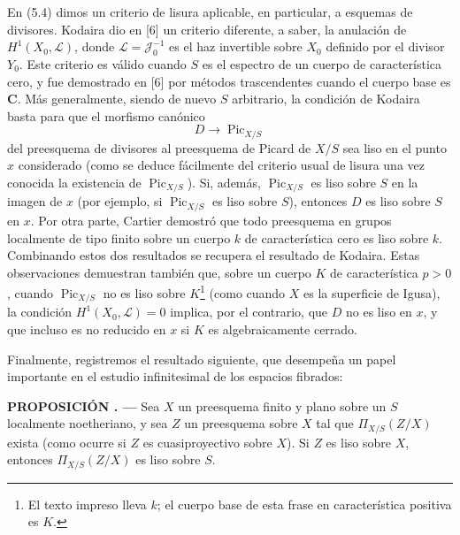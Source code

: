 \documentclass[11pt,twoside,openany]{book}
\numberwithin{equation}{section}
\theoremstyle{plain}
\theoremstyle{definition}
\theoremstyle{remark}
\newcommand{\result}[2]{%
  \par\medskip\noindent\textbf{#1%
  \if\relax\detokenize{#2}\relax\else\space#2\fi. ---}\enspace
}
\theoremstyle{plain}
\theoremstyle{definition}
\theoremstyle{remark}
\begin{document}
En (5.4) dimos un criterio de lisura aplicable, en particular, a esquemas de
divisores. Kodaira dio en [6] un criterio diferente, a saber, la anulación de
$H^1(X_0,\mathcal L)$, donde $\mathcal L=\mathcal J_0^{-1}$ es el haz
invertible sobre $X_0$ definido por el divisor $Y_0$. Este criterio es válido
cuando $S$ es el espectro de un cuerpo de característica cero, y fue demostrado
en [6] por métodos trascendentes cuando el cuerpo base es $\mathbf C$. Más
generalmente, siendo de nuevo $S$ arbitrario, la condición de Kodaira basta
para que el morfismo canónico
\[
D\longrightarrow\operatorname{Pic}_{X/S}
\]
del preesquema de divisores al preesquema de Picard de $X/S$ sea liso en el
punto $x$ considerado (como se deduce fácilmente del criterio usual de lisura
una vez conocida la existencia de $\operatorname{Pic}_{X/S}$). Si, además,
$\operatorname{Pic}_{X/S}$ es liso sobre $S$ en la imagen de $x$ (por ejemplo,
si $\operatorname{Pic}_{X/S}$ es liso sobre $S$), entonces $D$ es liso sobre
$S$ en $x$. Por otra parte, Cartier demostró que todo preesquema en grupos
localmente de tipo finito sobre un cuerpo $k$ de característica cero es liso
sobre $k$. Combinando estos dos resultados se recupera el resultado de
Kodaira. Estas observaciones demuestran también que, sobre un cuerpo $K$ de
característica $p>0$, cuando $\operatorname{Pic}_{X/S}$ no es liso sobre $K$\footnote{El texto impreso lleva $k$; el cuerpo base de esta frase en característica positiva es $K$.}
(como cuando $X$ es la superficie de Igusa), la condición
$H^1(X_0,\mathcal L)=0$ implica, por el contrario, que $D$ no es liso en $x$,
y que incluso es no reducido en $x$ si $K$ es algebraicamente cerrado.

Finalmente, registremos el resultado siguiente, que desempeña un papel
importante en el estudio infinitesimal de los espacios fibrados:

\result{PROPOSICIÓN}{5.7} Sea $X$ un preesquema finito y plano sobre un $S$
localmente noetheriano, y sea $Z$ un preesquema sobre $X$ tal que
$\Pi_{X/S}(Z/X)$ exista (como ocurre si $Z$ es cuasiproyectivo sobre $X$). Si
$Z$ es liso sobre $X$, entonces $\Pi_{X/S}(Z/X)$ es liso sobre $S$.
\end{document}
